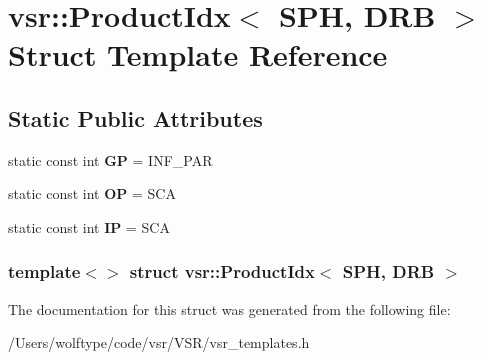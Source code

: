 \hypertarget{structvsr_1_1_product_idx_3_01_s_p_h_00_01_d_r_b_01_4}{\section{vsr\-:\-:Product\-Idx$<$ S\-P\-H, D\-R\-B $>$ Struct Template Reference}
\label{structvsr_1_1_product_idx_3_01_s_p_h_00_01_d_r_b_01_4}
}
\subsection*{Static Public Attributes}
\begin{DoxyCompactItemize}
\item 
\hypertarget{structvsr_1_1_product_idx_3_01_s_p_h_00_01_d_r_b_01_4_ad65bb253003551c036b4669287f05110}{static const int {\bfseries G\-P} = I\-N\-F\-\_\-\-P\-A\-R}\label{structvsr_1_1_product_idx_3_01_s_p_h_00_01_d_r_b_01_4_ad65bb253003551c036b4669287f05110}

\item 
\hypertarget{structvsr_1_1_product_idx_3_01_s_p_h_00_01_d_r_b_01_4_a1a41eb949de08fbeababdeff2b36ca24}{static const int {\bfseries O\-P} = S\-C\-A}\label{structvsr_1_1_product_idx_3_01_s_p_h_00_01_d_r_b_01_4_a1a41eb949de08fbeababdeff2b36ca24}

\item 
\hypertarget{structvsr_1_1_product_idx_3_01_s_p_h_00_01_d_r_b_01_4_a8a698b216996df70b58663ad8f23dcac}{static const int {\bfseries I\-P} = S\-C\-A}\label{structvsr_1_1_product_idx_3_01_s_p_h_00_01_d_r_b_01_4_a8a698b216996df70b58663ad8f23dcac}

\end{DoxyCompactItemize}
\subsubsection*{template$<$$>$ struct vsr\-::\-Product\-Idx$<$ S\-P\-H, D\-R\-B $>$}



The documentation for this struct was generated from the following file\-:\begin{DoxyCompactItemize}
\item 
/\-Users/wolftype/code/vsr/\-V\-S\-R/vsr\-\_\-templates.\-h\end{DoxyCompactItemize}

